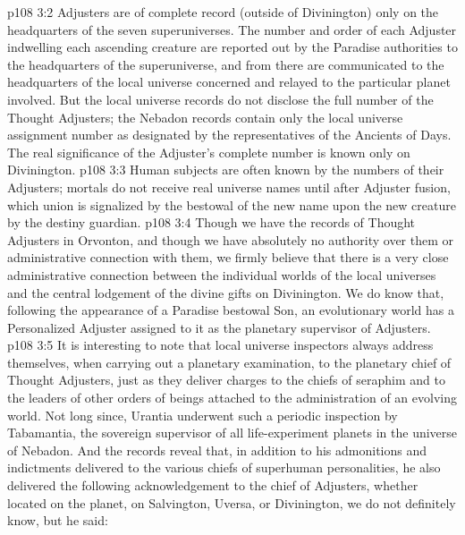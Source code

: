 \vs p108 3:2 Adjusters are of complete record (outside of Divinington) only on the headquarters of the seven superuniverses. The number and order of each Adjuster indwelling each ascending creature are reported out by the Paradise authorities to the headquarters of the superuniverse, and from there are communicated to the headquarters of the local universe concerned and relayed to the particular planet involved. But the local universe records do not disclose the full number of the Thought Adjusters; the Nebadon records contain only the local universe assignment number as designated by the representatives of the Ancients of Days. The real significance of the Adjuster’s complete number is known only on Divinington.
\vs p108 3:3 Human subjects are often known by the numbers of their Adjusters; mortals do not receive real universe names until after Adjuster fusion, which union is signalized by the bestowal of the new name upon the new creature by the destiny guardian.
\vs p108 3:4 Though we have the records of Thought Adjusters in Orvonton, and though we have absolutely no authority over them or administrative connection with them, we firmly believe that there is a very close administrative connection between the individual worlds of the local universes and the central lodgement of the divine gifts on Divinington. We do know that, following the appearance of a Paradise bestowal Son, an evolutionary world has a Personalized Adjuster assigned to it as the planetary supervisor of Adjusters.
\vs p108 3:5 \pc It is interesting to note that local universe inspectors always address themselves, when carrying out a planetary examination, to the planetary chief of Thought Adjusters, just as they deliver charges to the chiefs of seraphim and to the leaders of other orders of beings attached to the administration of an evolving world. Not long since, Urantia underwent such a periodic inspection by Tabamantia, the sovereign supervisor of all life\hyp{}experiment planets in the universe of Nebadon. And the records reveal that, in addition to his admonitions and indictments delivered to the various chiefs of superhuman personalities, he also delivered the following acknowledgement to the chief of Adjusters, whether located on the planet, on Salvington, Uversa, or Divinington, we do not definitely know, but he said:
